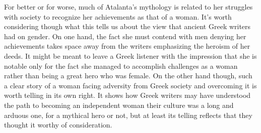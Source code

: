 \documentclass[letterpaper, reqno,11pt]{article}
\begin{document}
\medskip

For better or for worse, much of Atalanta's mythology is related to her struggles with society to recognize her achievements as that of a woman. It's worth considering though what this tells us about the view that ancient Greek writers had on gender. On one hand, the fact she must contend with men denying her achievements takes space away from the writers emphasizing the heroism of her deeds. It might be meant to leave a Greek listener with the impression that she is notable only for the fact she managed to accomplish challenges as a woman rather than being a great hero who was female. On the other hand though, such a clear story of a woman facing adversity from Greek society and overcoming it is worth telling in its own right. It shows how Greek writers may have understood the path to becoming an independent woman their culture was a long and arduous one, for a mythical hero or not, but at least its telling reflects that they thought it worthy of consideration.

\pagebreak

\printbibliography
\end{document}
